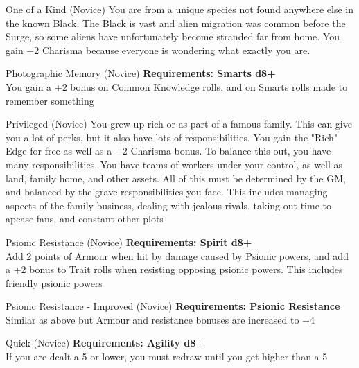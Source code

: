 \begin{multicols}{2}
\begin{genericsection}{One of a Kind (Novice)}
You are from a unique species not found anywhere else in the known Black. The Black is vast and alien migration was common before the Surge, so some aliens have unfortunately become stranded far from home. You gain +2 Charisma because everyone is wondering what exactly you are.
\end{genericsection}

\begin{genericsection}{Photographic Memory (Novice)}
\textbf{Requirements: Smarts d8+}\\
You gain a +2 bonus on Common Knowledge rolls, and on Smarts rolls made to remember something
\end{genericsection}

\begin{genericsection}{Privileged (Novice)}
You grew up rich or as part of a famous family. This can give you a lot of perks, but it also have lots of responsibilities. You gain the "Rich" Edge for free as well as a +2 Charisma bonus. To balance this out, you have many responsibilities. You have teams of workers under your control, as well as land, family home, and other assets. All of this must be determined by the GM, and balanced by the grave responsibilities you face. This includes managing aspects of the family business, dealing with jealous rivals, taking out time to apease fans, and constant other plots
\end{genericsection}

\begin{genericsection}{Psionic Resistance (Novice)}
\textbf{Requirements: Spirit d8+}\\
Add 2 points of Armour when hit by damage caused by Psionic powers, and add a +2 bonus to Trait rolls when resisting opposing psionic powers. This includes friendly psionic powers
\end{genericsection}

\begin{genericsection}{Psionic Resistance - Improved (Novice)}
\textbf{Requirements: Psionic Resistance}\\
Similar as above but Armour and resistance bonuses are increased to +4
\end{genericsection}

\begin{genericsection}{Quick (Novice)}
\textbf{Requirements: Agility d8+}\\
If you are dealt a 5 or lower, you must redraw until you get higher than a 5
\end{genericsection}


\end{multicols}
